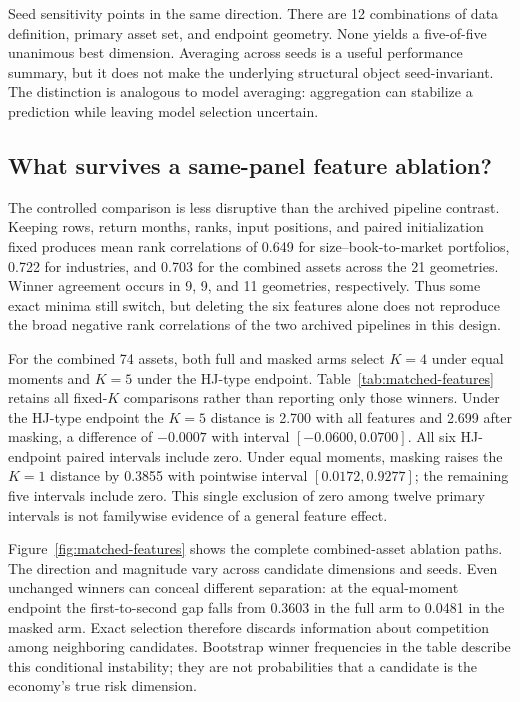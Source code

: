 Seed sensitivity points in the same direction. There are 12 combinations of data definition, primary asset set, and endpoint geometry. None yields a five-of-five unanimous best dimension. Averaging across seeds is a useful performance summary, but it does not make the underlying structural object seed-invariant. The distinction is analogous to model averaging: aggregation can stabilize a prediction while leaving model selection uncertain.

\subsection{What survives a same-panel feature ablation?}

The controlled comparison is less disruptive than the archived pipeline contrast. Keeping rows, return months, ranks, input positions, and paired initialization fixed produces mean rank correlations of 0.649 for size--book-to-market portfolios, 0.722 for industries, and 0.703 for the combined assets across the 21 geometries. Winner agreement occurs in 9, 9, and 11 geometries, respectively. Thus some exact minima still switch, but deleting the six features alone does not reproduce the broad negative rank correlations of the two archived pipelines in this design.

For the combined 74 assets, both full and masked arms select $K=4$ under equal moments and $K=5$ under the HJ-type endpoint. Table~\ref{tab:matched-features} retains all fixed-$K$ comparisons rather than reporting only those winners. Under the HJ-type endpoint the $K=5$ distance is 2.700 with all features and 2.699 after masking, a difference of $-0.0007$ with interval $[-0.0600,0.0700]$. All six HJ-endpoint paired intervals include zero. Under equal moments, masking raises the $K=1$ distance by 0.3855 with pointwise interval $[0.0172,0.9277]$; the remaining five intervals include zero. This single exclusion of zero among twelve primary intervals is not familywise evidence of a general feature effect.



Figure~\ref{fig:matched-features} shows the complete combined-asset ablation paths. The direction and magnitude vary across candidate dimensions and seeds. Even unchanged winners can conceal different separation: at the equal-moment endpoint the first-to-second gap falls from 0.3603 in the full arm to 0.0481 in the masked arm. Exact selection therefore discards information about competition among neighboring candidates. Bootstrap winner frequencies in the table describe this conditional instability; they are not probabilities that a candidate is the economy's true risk dimension.

